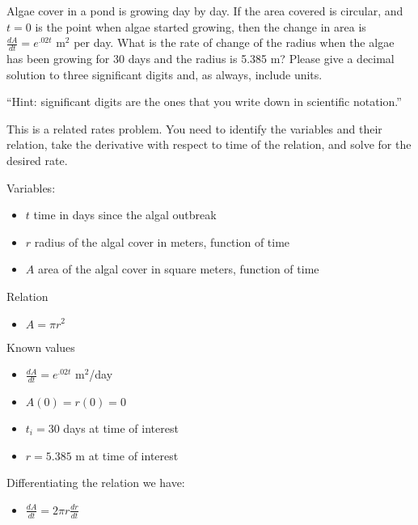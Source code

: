 \documentclass{ximera}
\author{Emma Smith Zbarsky}
\begin{document}
\begin{exercise}

Algae cover in a pond is growing day by day. If the area covered is
circular, and $t=0$ is the point when algae started growing, then the
change in area is $\frac{dA}{dt} = e^{.02t}$ m$^2$ per day. What is the
rate of change of the radius when the algae has been growing for 30 days
and the radius is 5.385 m? Please give a decimal solution to three
significant digits and, as always, include units.

``Hint: significant digits are the ones that you write down in
scientific notation.''


\begin{hint}
This is a related rates problem. You need to identify the variables and
their relation, take the derivative with respect to time of the
relation, and solve for the desired rate.
\end{hint}


\begin{hint}
Variables:

\begin{itemize}
\item
  $t$ time in days since the algal outbreak
\item
  $r$ radius of the algal cover in meters, function of time
\item
  $A$ area of the algal cover in square meters, function of time
\end{itemize}

Relation

\begin{itemize}
\itemsep1pt\parskip0pt
\item
  $A = \pi r^2$
\end{itemize}

Known values

\begin{itemize}
\item
  $\frac{dA}{dt} = e^{.02t}$ m$^2$/day
\item
  $A(0) = r(0) = 0$
\item
  $t_i = 30$ days at time of interest
\item
  $r=5.385$ m at time of interest
\end{itemize}

Differentiating the relation we have:

\begin{itemize}
\itemsep1pt\parskip0pt
\item
  $\frac{dA}{dt} = 2\pi r \frac{dr}{dt}$
\end{itemize}


\end{hint}
\end{exercise}
\end{document}

